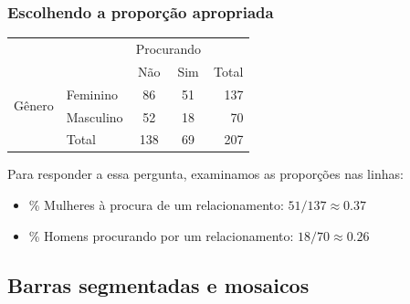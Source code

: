 
\begin{frame}
\frametitle{Escolhendo a proporção apropriada}
\justifying
{}

\begin{center}
\begin{tabular}{l l cc r}
					& 			& \multicolumn{2}{c}{{Procurando }} \\
  \cline{3-4}
					&			& Não	& Sim	& Total \\ 
  \cline{2-5}
\multirow{2}{*}{{Gênero}}& Feminino 		& 86 	& 51 		& 137 \\ 
  					& Masculino 		& 52 	& 18	 	& 70\\ 
  \cline{2-5}
  					& Total		& 138& 69	&  207 \\
  \cline{2-5}
\end{tabular}
\end{center}

\pause
\justifying
Para responder a essa pergunta, examinamos as proporções nas linhas: 

\pause

\begin{itemize}
\justifying
\item \% Mulheres à procura de um relacionamento: $51 / 137 \approx 0.37$ \\

\pause
\justifying
\item \% Homens procurando por um relacionamento: $18 / 70 \approx 0.26$ \\

\end{itemize}

\end{frame}


\subsection{Barras segmentadas e mosaicos}


